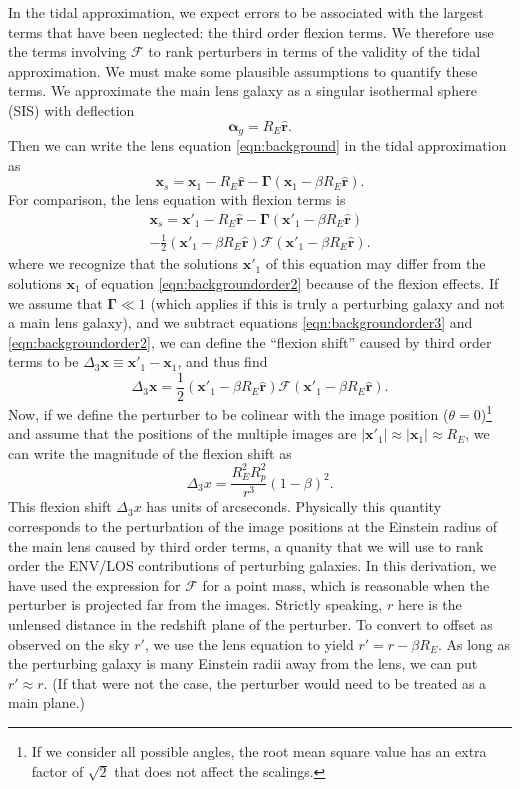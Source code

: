 \documentclass{emulateapj}
\newcommand\GammaMat[0]{\boldsymbol{\Gamma}}
\newcommand\x[0]{\mathbf{x}}
\renewcommand\vec[1]{\mathbf{#1}}
\newcommand\al[0]{\boldsymbol{\alpha}}
\newcommand\rhat[0]{\vec{\hat{r}}}
\newcommand\sF{{\mathcal F}}
\begin{document}
In the tidal approximation, we expect errors to be associated with the largest terms that have been neglected: the third order flexion terms.  We therefore use the terms involving $\sF$ to rank perturbers in terms of the validity of the tidal approximation.  We must make some plausible assumptions to quantify these terms.  We approximate the main lens galaxy as a singular isothermal sphere (SIS) with deflection
\begin{equation}
\al_g = R_E \rhat.
\end{equation}
Then we can write the lens equation \ref{eqn:background} in the tidal approximation as
\begin{equation}
\label{eqn:backgroundorder2}
\x_s = \x_1 - R_E \rhat -  \GammaMat (\x_1 - \beta R_E \rhat).
\end{equation}
For comparison, the lens equation with flexion terms is
\begin{multline}
\x_s = \x'_1 - R_E\rhat -  \GammaMat(\x'_1 - \beta R_E\rhat) \\
- \frac{1}{2}(\x'_1 - \beta R_E\rhat) \sF (\x'_1 - \beta R_E \rhat).
\label{eqn:backgroundorder3}
\end{multline}
where we recognize that the solutions $\x'_1$ of this equation may differ from the solutions $\x_1$ of equation \ref{eqn:backgroundorder2} because of the flexion effects.  If we assume that $\GammaMat \ll 1$ (which applies if this is truly a perturbing galaxy and not a main lens galaxy), and we subtract equations \ref{eqn:backgroundorder3} and \ref{eqn:backgroundorder2}, we can define the ``flexion shift'' caused by third order terms to be $\Delta_3 \x \equiv \x'_1 - \x_1$, and thus find
\begin{equation}
\Delta_3 \x = \frac{1}{2} (\x'_1 - \beta R_E \rhat) \sF (\x'_1 - \beta R_E \rhat).
\end{equation}
Now, if we define the perturber to be colinear with the image position ($\theta  = 0$)\footnote{If we consider all possible angles, the root mean square value has an extra factor of $\sqrt{2}$ that does not affect the scalings.} and assume that the positions of the multiple images are $|\x'_1| \approx |\x_1| \approx R_E$, we can write the magnitude of the flexion shift as
\begin{equation}
\Delta_3 x = \frac{R_E^2 R_p^2}{r^3} (1 - \beta)^2. 
\label{eqn:backgroundd3x}
\end{equation}
This flexion shift $\Delta_3 x$ has units of arcseconds. Physically this quantity corresponds to the perturbation of the image positions at the Einstein radius of the main lens caused by third order terms, a quanity that we will use to rank order the ENV/LOS contributions of perturbing galaxies.
In this derivation, we have used the expression for $\sF$ for a point mass, which is reasonable when the perturber is projected far from the images.  Strictly speaking, $r$ here is the unlensed distance in the redshift plane of the perturber. To convert to offset as observed on the sky $r'$, we use the lens equation to yield $r' = r - \beta R_E$. As long as the perturbing galaxy is many Einstein radii away from the lens, we can put $r' \approx r$.  (If that were not the case, the perturber would need to be treated as a main plane.)
\end{document}
